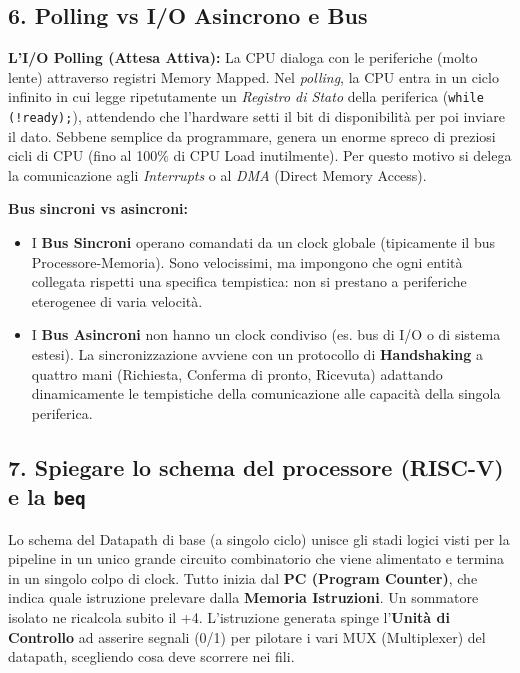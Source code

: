 \documentclass[12pt, a4paper]{article}
\begin{document}
\subsection{6. Polling vs I/O Asincrono e Bus}
\textbf{L'I/O Polling (Attesa Attiva):} La CPU dialoga con le periferiche (molto lente) attraverso registri Memory Mapped. Nel \textit{polling}, la CPU entra in un ciclo infinito in cui legge ripetutamente un \textit{Registro di Stato} della periferica (\texttt{while (!ready);}), attendendo che l'hardware setti il bit di disponibilità per poi inviare il dato. Sebbene semplice da programmare, genera un enorme spreco di preziosi cicli di CPU (fino al 100\% di CPU Load inutilmente).
Per questo motivo si delega la comunicazione agli \textit{Interrupts} o al \textit{DMA} (Direct Memory Access).

\textbf{Bus sincroni vs asincroni:}
\begin{itemize}
    \item I \textbf{Bus Sincroni} operano comandati da un clock globale (tipicamente il bus Processore-Memoria). Sono velocissimi, ma impongono che ogni entità collegata rispetti una specifica tempistica: non si prestano a periferiche eterogenee di varia velocità.
    \item I \textbf{Bus Asincroni} non hanno un clock condiviso (es. bus di I/O o di sistema estesi). La sincronizzazione avviene con un protocollo di \textbf{Handshaking} a quattro mani (Richiesta, Conferma di pronto, Ricevuta) adattando dinamicamente le tempistiche della comunicazione alle capacità della singola periferica.
\end{itemize}

\newpage

\subsection{7. Spiegare lo schema del processore (RISC-V) e la \texttt{beq}}
Lo schema del Datapath di base (a singolo ciclo) unisce gli stadi logici visti per la pipeline in un unico grande circuito combinatorio che viene alimentato e termina in un singolo colpo di clock.
Tutto inizia dal \textbf{PC (Program Counter)}, che indica quale istruzione prelevare dalla \textbf{Memoria Istruzioni}. Un sommatore isolato ne ricalcola subito il +4. 
L'istruzione generata spinge l'\textbf{Unità di Controllo} ad asserire segnali (0/1) per pilotare i vari MUX (Multiplexer) del datapath, scegliendo cosa deve scorrere nei fili.
\end{document}

